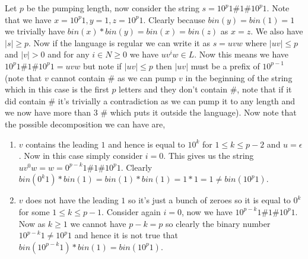 \documentclass[11pt]{article}
\begin{document}
\begin{enumerate}
\begin{answer}
  Let $p$ be the pumping length, now consider the string $s = 10^{p}1\#1\#10^{p}1$. Note that we have $x = 10^{p}1, y = 1, z = 10^{p}1$. Clearly because $bin(y) = bin(1) = 1$ we trivially have $bin(x) * bin(y) = bin(x) = bin(z)$ as $x = z$. We also have $|s| \ge p$. Now if the language is regular  we can write it as $s = uvw$ where $|uv| \le p$ and $|v| > 0$  and for any $i \in N \ge 0$ we have $uv^{i}w \in L$. Now this means we have $10^{p}1 \# 1 \# 10^{p}1 = uvw$ but note if $|uv| \le p$ then $|uv|$ must be a prefix of $10^{p - 1}$ (note that $v$ cannot contain $\#$ as we can pump $v$ in the beginning of the string which in this case is the first $p$ letters and they don't contain $\#$, note that if it did contain $\#$ it's trivially a contradiction as we can pump it to any length and we now have more than 3 $\#$ which puts it outside the language). Now note that the possible decomposition we can have are,
  \begin{enumerate}
    \item $v$ contains the leading $1$ and hence is equal to $10^{k}$ for $1 \le k \le p - 2$ and $u = \epsilon$. Now in this case simply consider $i = 0$. This gives us the string $uv^{0}w = w = 0^{p - k}1\#1\#10^{p}1$. Clearly $bin(0^{k}1) * bin(1)  = bin(1)* bin(1) = 1 * 1= 1 \ne bin(10^{p}1)$.
    \item $v$ does not have the leading $1$ so it's just a bunch of zeroes so it is equal to $0^{k}$ for some $1 \le k \le p - 1$. Consider again $i = 0$, now we have $10^{p - k}1\# 1 \# 10^{p}1$. Now as $k \ge 1$ we cannot have $p - k = p$ so clearly the binary number $10^{p - k}1 \ne 10^{p}1$ and hence it is not true that $bin(10^{p - k}1) * bin(1) = bin(10^{p}1)$.
  \end{enumerate}

\end{answer}

\end{enumerate}
\end{document}
